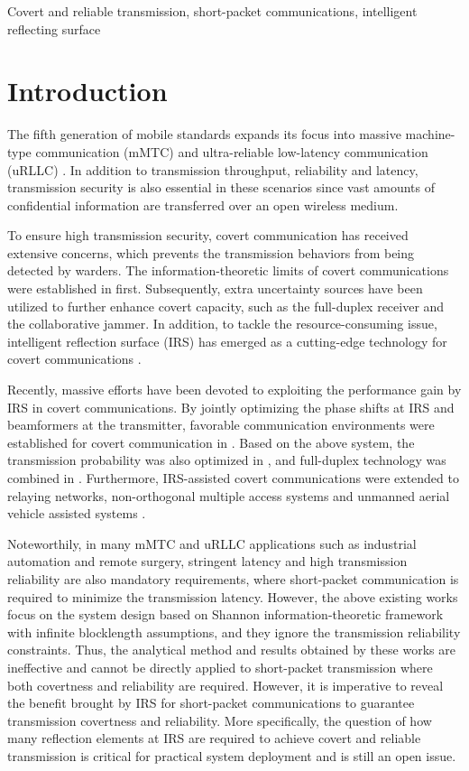\documentclass[conference]{IEEEtran}
\begin{document}
\begin{IEEEkeywords}
Covert and reliable transmission, short-packet communications, intelligent reflecting surface
\end{IEEEkeywords}

\section{Introduction}
The fifth generation of mobile standards expands its focus into massive machine-type communication (mMTC) and ultra-reliable low-latency communication (uRLLC) \cite{intro_short1}. In addition to transmission throughput, reliability and latency, transmission security is also essential in these scenarios since vast amounts of confidential information are transferred over an open wireless medium.

To ensure high transmission security, covert communication has received extensive concerns, which prevents the transmission behaviors from being detected by warders\cite{intro_covert}. The information-theoretic limits of covert communications were established in \cite{intro_covert} first. Subsequently, extra uncertainty sources have been utilized to further enhance covert capacity, such as the full-duplex receiver and the collaborative jammer. In addition, to tackle the resource-consuming issue, intelligent reflection surface (IRS) has emerged as a cutting-edge technology for covert communications \cite{intro_IRS1}.

Recently, massive efforts have been devoted to exploiting the performance gain  by IRS in covert communications. By jointly optimizing the phase shifts at IRS and beamformers at the transmitter, favorable communication environments were established for covert communication in \cite{IRS3,IRS_single10}. Based on the above system, the transmission probability was also optimized in \cite{IRS_single8}, and full-duplex technology was combined in \cite{IRS_single7}. Furthermore, IRS-assisted covert communications were extended to relaying networks\cite{IRS1}, non-orthogonal multiple access systems \cite{IRS_single2} and unmanned aerial vehicle assisted systems \cite{IRS_UAV1}.

Noteworthily, in many mMTC and uRLLC applications such as industrial automation and remote surgery, stringent latency and high transmission reliability are also mandatory requirements, where short-packet communication is required to minimize the transmission latency. However, the above existing works \cite{IRS3,IRS_single8,IRS_single10,IRS_single7,IRS_single2,IRS_UAV1,IRS1} focus on the system design based on Shannon information-theoretic framework with infinite blocklength assumptions, and they ignore the transmission reliability constraints. Thus, the analytical method and results obtained by these works are ineffective and cannot be directly applied to short-packet transmission where both covertness and reliability are required. However, it is imperative to reveal the benefit brought by IRS for short-packet communications to guarantee transmission covertness and reliability. More specifically, the question of how many reflection elements at IRS are required to achieve covert and reliable transmission is critical for practical system deployment and is still an open issue.
\end{document}
